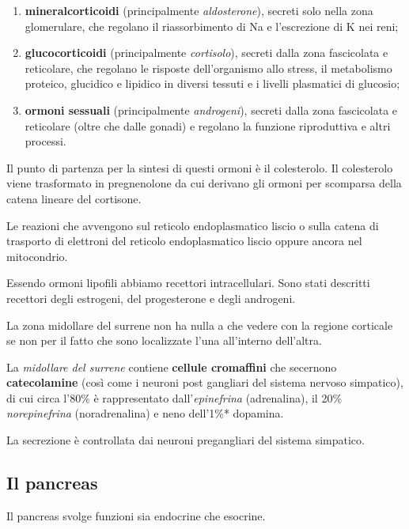 \documentclass[]{article}
\begin{document}
\begin{enumerate}
\def\labelenumi{\arabic{enumi}.}
\itemsep1pt\parskip0pt
\item
  \textbf{mineralcorticoidi} (principalmente \emph{aldosterone}),
  secreti solo nella zona glomerulare, che regolano il riassorbimento di
  Na e l'escrezione di K nei reni;
\item
  \textbf{glucocorticoidi} (principalmente \emph{cortisolo}), secreti
  dalla zona fascicolata e reticolare, che regolano le risposte
  dell'organismo allo stress, il metabolismo proteico, glucidico e
  lipidico in diversi tessuti e i livelli plasmatici di glucosio;
\item
  \textbf{ormoni sessuali} (principalmente \emph{androgeni}), secreti
  dalla zona fascicolata e reticolare (oltre che dalle gonadi) e
  regolano la funzione riproduttiva e altri processi.
\end{enumerate}

Il punto di partenza per la sintesi di questi ormoni è il colesterolo.
Il colesterolo viene trasformato in pregnenolone da cui derivano gli
ormoni per scomparsa della catena lineare del cortisone.

Le reazioni che avvengono sul reticolo endoplasmatico liscio o sulla
catena di trasporto di elettroni del reticolo endoplasmatico liscio
oppure ancora nel mitocondrio.

Essendo ormoni lipofili abbiamo recettori intracellulari. Sono stati
descritti recettori degli estrogeni, del progesterone e degli androgeni.

La zona midollare del surrene non ha nulla a che vedere con la regione
corticale se non per il fatto che sono localizzate l'una all'interno
dell'altra.

La \emph{midollare del surrene} contiene \textbf{cellule cromaffini} che
secernono \textbf{catecolamine} (così come i neuroni post gangliari del
sistema nervoso simpatico), di cui circa l'80\% è rappresentato
dall'\emph{epinefrina} (adrenalina), il 20\% \emph{norepinefrina}
(noradrenalina) e neno dell'1\%* dopamina.

La secrezione è controllata dai neuroni pregangliari del sistema
simpatico.

\subsection{Il pancreas}\label{il-pancreas}

Il pancreas svolge funzioni sia endocrine che esocrine.
\end{document}
